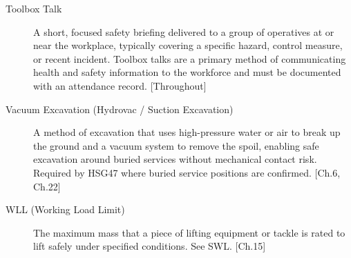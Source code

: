 \begin{description}
\item[Toolbox Talk] A short, focused safety briefing delivered to a group of operatives at or near the workplace, typically covering a specific hazard, control measure, or recent incident. Toolbox talks are a primary method of communicating health and safety information to the workforce and must be documented with an attendance record. [Throughout]

\item[Vacuum Excavation (Hydrovac / Suction Excavation)] A method of excavation that uses high-pressure water or air to break up the ground and a vacuum system to remove the spoil, enabling safe excavation around buried services without mechanical contact risk. Required by HSG47 where buried service positions are confirmed. [Ch.6, Ch.22]

\item[WLL (Working Load Limit)] The maximum mass that a piece of lifting equipment or tackle is rated to lift safely under specified conditions. See SWL. [Ch.15]

\end{description}
